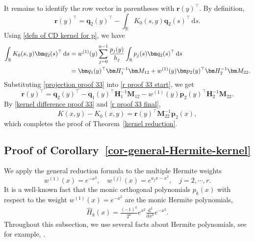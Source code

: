 \documentclass[a4paper,10pt,leqno]{amsart}
\numberwithin{equation}{section}
\theoremstyle{remark}
\newcommand{\dd}{\mathrm{d}}
\begin{document}
It remains to identify the row vector in parentheses with $\bm r(y)^\top$. By definition,
\begin{equation}\label{r proof 33 start}
    \bm r(y)^\top =\bm q_2(y)^\top -  \int_{\mathbb R}K_0(s,y)\bm q_2(s)^\top\,\dd s.
\end{equation}
Using \eqref{defn of CD kernel for p}, we have
\begin{align}\label{projection proof 33}
    \int_{\mathbb R}K_0(s,y)\bm q_2(s)^\top\,\dd s
    &=w^{(1)}(y) \sum_{j=0}^{n-1}\frac{p_j(y)}{h_j} \int_{\mathbb R}p_j(s)\bm q_2(s)^\top\,\dd s \notag \\
    &= \bm q_1(y)^\top\bm H_1^{-1}\bm M_{12}   + w^{(1)}(y)\bm p_2(y)^\top\bm H_2^{-1}\bm M_{22}.
\end{align}
Substituting \eqref{projection proof 33} into \eqref{r proof 33 start}, we get
\begin{equation}\label{r proof 33 final}
    \bm r(y)^\top =\bm q_2(y)^\top -\bm q_1(y)^\top\bm H_1^{-1}\bm M_{12} - w^{(1)}(y)\bm p_2(y)^\top\bm H_2^{-1}\bm M_{22}.
\end{equation}
By \eqref{kernel difference proof 33} and \eqref{r proof 33 final},
\begin{equation}
    K(x,y)-K_0(x,y)=\bm r(y)^\top\bm M_{22}^{-1}\bm p_2(x),
\end{equation}
which completes the proof of Theorem~\ref{kernel reduction}.


\subsection{Proof of Corollary~\ref{cor-general-Hermite-kernel}} \label{subsec:proof-general-Hermite-kernel}

We apply the general reduction formula to the multiple Hermite weights
\begin{equation}
    w^{(1)}(x)=e^{-x^2},\quad w^{(j)}(x)=e^{a_jx-x^2},\quad j=2,\cdots,r.
\end{equation}
It is a well-known fact that the monic orthogonal polynomials $p_k(x)$ with respect to the weight $w^{(1)}(x) = e^{-x^2}$ are the monic Hermite polynomials, 
\begin{align} \label{defn of H-hat}
\widehat{H}_k(x) = \frac{(-1)^k}{2^k} e^{x^2} \frac{\dd^k}{\dd x^k} e^{-x^2}.
\end{align}
Throughout this subsection, we use several facts about Hermite polynomials, see for example, \cite[Sections 18.3, 18.5, 18.17, 18.18]{NIST:DLMF}.
\end{document}
